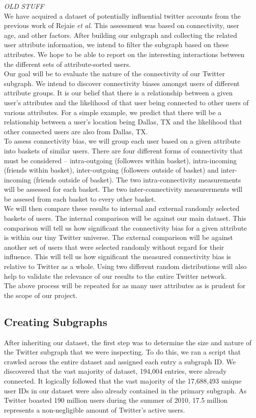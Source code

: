 \textit{OLD STUFF}\\
We have acquired a dataset of potentially influential twitter accounts from the previous work of Rejaie \textit{et al}.  This assessment was based on connectivity, user age, and other factors.  After building our subgraph and collecting the related user attribute information, we intend to filter the subgraph based on these attributes.  We hope to be able to report on the interesting interactions between the different sets of attribute-sorted users.\\
Our goal will be to evaluate the nature of the connectivity of our Twitter subgraph.  We intend to discover connectivity biases amongst users of different attribute groups.  It is our belief that there is a relationship between a given user's attributes and the likelihood of that user being connected to other users of various attributes.  For a simple example, we predict that there will be a relationship between a user's location being Dallas, TX and the likelihood that other connected users are also from Dallas, TX.\\
To assess connectivity bias, we will group each user based on a given attribute into baskets of similar users.  There are four different forms of connectivity that must be considered -- intra-outgoing (followers within basket), intra-incoming (friends within basket), inter-outgoing (followers outside of basket) and inter-incoming (friends outside of basket).  The two intra-connectivity measurements will be assessed for each basket.  The two inter-connectivity measurerments will be assesed from each basket to every other basket.\\
We will then compare these results to internal and external randomly selected baskets of users.  The internal comparison will be against our main dataset.  This comparison will tell us how significant the connectivity bias for a given attribute is within our tiny Twitter universe.  The external comparison will be against another set of users that were selected randomly without regard for their influence.  This will tell us how significant the measured connectivity bias is relative to Twitter as a whole.  Using two different random distributions will also help to validate the relevance of our results to the entire Twitter network.\\
The above process will be repeated for as many user attributes as is prudent for the scope of our project.

\subsection{Creating Subgraphs}
After inheriting our dataset, the first step was to determine the size and nature of the Twitter subgraph that we were inspecting.  To do this, we ran a script that crawled across the entire dataset and assigned each entry a subgraph ID.  We discovered that the vast majority of dataset, 194,004 entries, were already connected.  It logically followed that the vast majority of the 17,688,493 unique user IDs in our dataset were also already contained in the primary subgraph.  As Twitter boasted 190 million users during the summer of 2010, 17.5 million represents a non-negligible amount of Twitter's active users.

